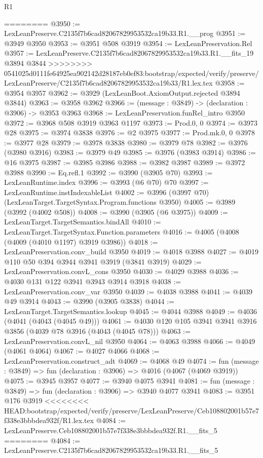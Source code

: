 \begin{lexlean}{R1}
\begin{coremodule}
{{{{{{{{{{{{{{{{{{{{{{{{{{{{{{{{{{{{{{{{{{{{{{{{{{{{{{{{{{{{{{{{{{{{{{{{{{{{{{{{{{{{{{{{{{{{{{{{{{{{{{{{{{{{{{{{{{{{{{{{{{{{{{{{{{{{{{{{{{{{{{{{{{{{{{{{{{{{{{{{{{{{{{{{{{{{{{{{{{{{{{{{{{========
@3950 := LexLeanPreserve.C2135f7b6cad82067829953532ca19b33.R1.__prog
@3951 := @3949 @3950
@3953 := @3951 @508 @3919
@3954 := LexLeanPreservation.Rel
@3957 := LexLeanPreserve.C2135f7b6cad82067829953532ca19b33.R1.__fits_19 @3894 @3844
>>>>>>>> 0541025d0111fe64925ea902142d28187eb0ef83:bootstrap/expected/verify/preserve/LexLeanPreserve/C2135f7b6cad82067829953532ca19b33/R1.lex.tex
@3958 := @3954 @3957
@3962 := @3929 (LexLeanBoot.AxiomOutput.rejected @3894 @3844)
@3963 := @3958 @3962
@3966 := (message : @3849) -> (declaration : @3906) -> @3953 @3963
@3968 := LexLeanPreservation.funRel_intro @3950
@3972 := @3968 @508 @3919 @3963 @1197
@3973 := Prod.{0, 0}
@3974 := @3973 @28
@3975 := @3974 @3838
@3976 := @2 @3975
@3977 := Prod.mk.{0, 0}
@3978 := @3977 @28
@3979 := @3978 @3838
@3980 := @3979 @78
@3982 := @3976 (@3980 @3916)
@3983 := @3979 @49
@3985 := @3976 (@3983 @3914)
@3986 := @16 @3975
@3987 := @3985 @3986
@3988 := @3982 @3987
@3989 := @3972 @3988
@3990 := Eq.refl.{1}
@3992 := @3990 (@3905 @70)
@3993 := LexLeanRuntime.index
@3996 := @3993 (@6 @70) @70
@3997 := LexLeanRuntime.instIndexableList
@4002 := @3996 (@3997 @70) (LexLeanTarget.TargetSyntax.Program.functions @3950)
@4005 := @3989 (@3992 (@4002 @508))
@4008 := @3990 (@3905 (@6 @3975))
@4009 := LexLeanTarget.TargetSemantics.bindAll
@4010 := LexLeanTarget.TargetSyntax.Function.parameters
@4016 := @4005 (@4008 (@4009 (@4010 @1197) @3919 @3986))
@4018 := LexLeanPreservation.conv_build @3950
@4019 := @4018 @3988
@4027 := @4019 @110 @50 @394 @3944 @3941 @3919 (@3841 @3919)
@4029 := LexLeanPreservation.convL_cons @3950
@4030 := @4029 @3988
@4036 := @4030 @131 @122 @3941 @3943 @3914 @3918
@4038 := LexLeanPreservation.conv_var @3950
@4039 := @4038 @3988
@4041 := @4039 @49 @3914
@4043 := @3990 (@3905 @3838)
@4044 := LexLeanTarget.TargetSemantics.lookup
@4045 := @4044 @3988
@4049 := @4036 (@4041 (@4043 (@4045 @49)))
@4061 := @4030 @120 @105 @3941 @3941 @3916 @3856 (@4039 @78 @3916 (@4043 (@4045 @78)))
@4063 := LexLeanPreservation.convL_nil @3950
@4064 := @4063 @3988
@4066 := @4049 (@4061 @4064)
@4067 := @4027 @4066
@4068 := LexLeanPreservation.construct_adt
@4069 := @4068 @49
@4074 := fun (message : @3849) => fun (declaration : @3906) => @4016 (@4067 (@4069 @3919))
@4075 := @3945 @3957
@4077 := @3940 @4075 @3941
@4081 := fun (message : @3849) => fun (declaration : @3906) => @3940 @4077 @3941
@4083 := @3951 @176 @3919
<<<<<<<< HEAD:bootstrap/expected/verify/preserve/LexLeanPreserve/Ceb108802001b57e7f338e3bbbdea932f/R1.lex.tex
@4084 := LexLeanPreserve.Ceb108802001b57e7f338e3bbbdea932f.R1.__fits_5
========
@4084 := LexLeanPreserve.C2135f7b6cad82067829953532ca19b33.R1.__fits_5
}}}}}}}}}}}}}}}}}}}}}}}}}}}}}}}}}}}}}}}}}}}}}}}}}}}}}}}}}}}}}}}}}}}}}}}}}}}}}}}}}}}}}}}}}}}}}}}}}}}}}}}}}}}}}}}}}}}}}}}}}}}}}}}}}}}}}}}}}}}}}}}}}}}}}}}}}}}}}}}}}}}}}}}}}}}}}}}}}}}}}}}}}}
\end{coremodule}
\end{lexlean}
